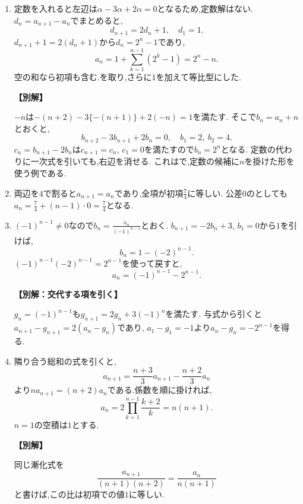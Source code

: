 \begin{enumerate}[label=\textbf{問\arabic*.},leftmargin=3.8em,format=\bookitemlink{practice-basic}{solution}{problem}]
  \item {}\BookMathLayout{}{\\}
    定数を入れると左辺は$\alpha-3\alpha+2\alpha=0$となるため,定数解はない.
    $d_n=a_{n+1}-a_n$でまとめると,
    \[
      d_{n+1}=2d_n+1,\quad d_1=1.
    \]
    $d_{n+1}+1=2(d_n+1)$から$d_n=2^n-1$であり,
    \[
      a_n=1+\sum_{k=1}^{n-1}(2^k-1)=2^n-n.
    \]
    空の和なら初項も含む.を取り,さらに$1$を加えて等比型にした.
    \par\smallskip\noindent\textbf{【別解】}\par
    $-n$は$-(n+2)-3\{-(n+1)\}+2(-n)=1$を満たす.
    そこで$b_n=a_n+n$とおくと,
    \[
      b_{n+2}-3b_{n+1}+2b_n=0,\quad b_1=2,\ b_2=4.
    \]
    $c_n=b_{n+1}-2b_n$は$c_{n+1}=c_n$, $c_1=0$を満たすので$b_n=2^n$となる.
    定数の代わりに一次式を引いても,右辺を消せる.
    これはで,定数の候補に$n$を掛けた形を使う例である.

  \item {}\BookMathLayout{}{\\}
    両辺を$4$で割ると$a_{n+1}=a_n$であり,全項が初項$\frac{7}{4}$に等しい.
    公差$0$のとしても$a_n=\frac{7}{4}+(n-1)\cdot0=\frac{7}{4}$となる.

  \item {}\BookMathLayout{}{\\}
    $(-1)^{n-1}\ne0$なので$b_n=\frac{a_n}{(-1)^{n-1}}$とおく.
    $b_{n+1}=-2b_n+3$, $b_1=0$から$1$を引けば,
    \[
      b_n=1-(-2)^{n-1}.
    \]
    $(-1)^{n-1}(-2)^{n-1}=2^{n-1}$を使って戻すと,
    \[
      a_n=(-1)^{n-1}-2^{n-1}.
    \]
    \par\smallskip\noindent\textbf{【別解：交代する項を引く】}\par
    $g_n=(-1)^{n-1}$も$g_{n+1}=2g_n+3(-1)^n$を満たす.
    与式から引くと$a_{n+1}-g_{n+1}=2(a_n-g_n)$であり,
    $a_1-g_1=-1$より$a_n-g_n=-2^{n-1}$を得る.

  \item {}\BookMathLayout{}{\\}
    隣り合う総和の式を引くと,
    \[
      a_{n+1}=\frac{n+3}3a_{n+1}-\frac{n+2}3a_n
    \]
    より$na_{n+1}=(n+2)a_n$である.係数を順に掛ければ,
    \[
      a_n=2\prod_{k=1}^{n-1}\frac{k+2}{k}=n(n+1).
    \]
    $n=1$の空積は$1$とする.
    \par\smallskip\noindent\textbf{【別解】}\par
    同じ漸化式を
    \[
      \frac{a_{n+1}}{(n+1)(n+2)}=\frac{a_n}{n(n+1)}
    \]
    と書けば,この比は初項での値$1$に等しい.
\end{enumerate}
